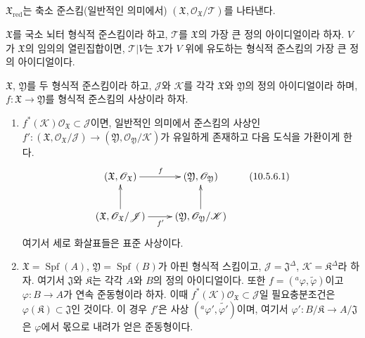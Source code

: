 $\mathfrak{X}_{\mathrm{red}}$는 축소 준스킴(일반적인 의미에서)
$(\mathfrak{X},\mathscr{O}_{\mathfrak{X}}/\mathscr{T})$를 나타낸다.

\begin{corollary}[10.5.5]
\label{I.10.5.5-ko}
$\mathfrak{X}$를 국소 뇌터 형식적 준스킴이라 하고, $\mathscr{T}$를
$\mathfrak{X}$의 가장 큰 정의 아이디얼이라 하자. $V$가
$\mathfrak{X}$의 임의의 열린집합이면, $\mathscr{T}|V$는
$\mathfrak{X}$가 $V$ 위에 유도하는 형식적 준스킴의 가장 큰 정의
아이디얼이다.
\end{corollary}


\begin{proposition}[10.5.6]
\label{I.10.5.6-ko}
$\mathfrak{X}$, $\mathfrak{Y}$를 두 형식적 준스킴이라 하고,
$\mathscr{J}$와 $\mathscr{K}$를 각각 $\mathfrak{X}$와
$\mathfrak{Y}$의 정의 아이디얼이라 하며,
$f:\mathfrak{X}\to\mathfrak{Y}$를 형식적 준스킴의 사상이라 하자.
\begin{enumerate}
  \item[{\upshape(i)}]
    $f^*(\mathscr{K})\mathscr{O}_{\mathfrak{X}}\subset\mathscr{J}$이면,
    일반적인 의미에서 준스킴의 사상인
    $f':(\mathfrak{X},\mathscr{O}_{\mathfrak{X}}/\mathscr{J})\to
    (\mathfrak{Y},\mathscr{O}_{\mathfrak{Y}}/\mathscr{K})$가 유일하게
    존재하고 다음 도식을 가환이게 한다.
    \[
      \label{I.10.5.6.1-ko}
      \xymatrix{
        (\mathfrak{X},\mathscr{O}_{\mathfrak{X}})\ar[r]^f &
        (\mathfrak{Y},\mathscr{O}_{\mathfrak{Y}})\\
        (\mathfrak{X},\mathscr{O}_{\mathfrak{X}}/\mathscr{J})
          \ar[r]_{f'}\ar[u] &
        (\mathfrak{Y},\mathscr{O}_{\mathfrak{Y}}/\mathscr{K})\ar[u]
      }
      \tag{10.5.6.1}
    \]
    여기서 세로 화살표들은 표준 사상이다.
  \item[{\upshape(ii)}]
    $\mathfrak{X}=\operatorname{Spf}(A)$,
    $\mathfrak{Y}=\operatorname{Spf}(B)$가 아핀 형식적 스킴이고,
    $\mathscr{J}=\mathfrak{J}^{\Delta}$,
    $\mathscr{K}=\mathfrak{K}^{\Delta}$라 하자. 여기서
    $\mathfrak{J}$와 $\mathfrak{K}$는 각각 $A$와 $B$의 정의
    아이디얼이다. 또한
    $f=({}^a\varphi,\widetilde{\varphi})$이고
    $\varphi:B\to A$가 연속 준동형이라 하자. 이때
    $f^*(\mathscr{K})\mathscr{O}_{\mathfrak{X}}\subset\mathscr{J}$일
    필요충분조건은
    $\varphi(\mathfrak{K})\subset\mathfrak{J}$인 것이다. 이 경우
    $f'$은 사상 $({}^a\varphi',\widetilde{\varphi'})$이며, 여기서
    $\varphi':B/\mathfrak{K}\to A/\mathfrak{J}$은 $\varphi$에서
    몫으로 내려가 얻은 준동형이다.
\end{enumerate}
\end{proposition}

